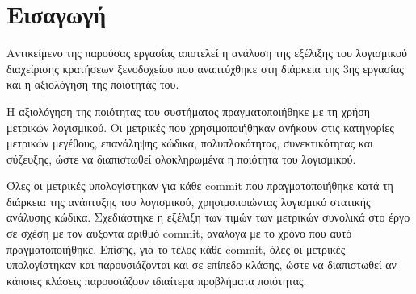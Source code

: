 \section{Εισαγωγή}

Αντικείμενο της παρούσας εργασίας αποτελεί η ανάλυση της εξέλιξης του
λογισμικού διαχείρισης κρατήσεων ξενοδοχείου που αναπτύχθηκε στη
διάρκεια της 3ης εργασίας και η αξιολόγηση της ποιότητάς του.

Η αξιολόγηση της ποιότητας του συστήματος πραγματοποιήθηκε με τη χρήση
μετρικών λογισμικού. Οι μετρικές που χρησιμοποιήθηκαν ανήκουν στις
κατηγορίες μετρικών μεγέθους, επανάληψης κώδικα, πολυπλοκότητας,
συνεκτικότητας και σύζευξης, ώστε να διαπιστωθεί ολοκληρωμένα η ποιότητα
του λογισμικού.

Όλες οι μετρικές υπολογίστηκαν για κάθε commit που πραγματοποιήθηκε κατά τη
διάρκεια της ανάπτυξης του λογισμικού, χρησιμοποιώντας λογισμικό
στατικής ανάλυσης κώδικα. Σχεδιάστηκε η εξέλιξη των τιμών των μετρικών
συνολικά στο έργο σε σχέση με τον αύξοντα αριθμό commit, ανάλογα με το
χρόνο που αυτό πραγματοποιήθηκε. Επίσης, για το τέλος κάθε commit, όλες
οι μετρικές υπολογίστηκαν και παρουσιάζονται και σε επίπεδο κλάσης, ώστε
να διαπιστωθεί αν κάποιες κλάσεις παρουσιάζουν ιδιαίτερα προβλήματα
ποιότητας.
